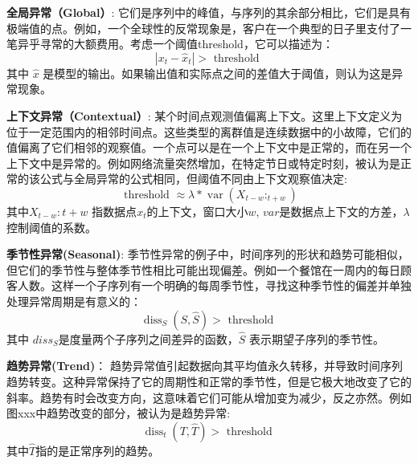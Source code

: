 \textbf{全局异常（Global）}: 它们是序列中的峰值，与序列的其余部分相比，它们是具有极端值的点。例如，一个全球性的反常现象是，客户在一个典型的日子里支付了一笔异乎寻常的大额费用。考虑一个阈值threshold，它可以描述为：
\begin{equation}
    \left|x_t-\hat{x}_t\right|>\text { threshold }
    \end{equation}
其中 $\hat{x}$ 是模型的输出。如果输出值和实际点之间的差值大于阈值，则认为这是异常现象。

\textbf{上下文异常（Contextual）}: 某个时间点观测值偏离上下文。这里上下文定义为位于一定范围内的相邻时间点。这些类型的离群值是连续数据中的小故障，它们的值偏离了它们相邻的观察值。一个点可以是在一个上下文中是正常的，而在另一个上下文中是异常的。例如网络流量突然增加，在特定节日或特定时刻，被认为是正常的该公式与全局异常的公式相同，但阈值不同由上下文观察值决定:
\begin{equation}
    \text { threshold } \approx \lambda * \operatorname{var}\left(X_{t-w}:_{t+w}\right)
    \end{equation}
其中$X_{t-w}: t+w$ 指数据点$x_t$的上下文，窗口大小$w$, $var$是数据点上下文的方差，$\lambda$控制阈值的系数。

\textbf{季节性异常(Seasonal)}: 季节性异常的例子中，时间序列的形状和趋势可能相似，但它们的季节性与整体季节性相比可能出现偏差。例如一个餐馆在一周内的每日顾客人数。这样一个子序列有一个明确的每周季节性，寻找这种季节性的偏差并单独处理异常周期是有意义的：
\begin{equation}
    \operatorname{diss}_S(S, \hat{S})>\text { threshold }
    \end{equation}
其中 ${diss}_S $是度量两个子序列之间差异的函数，$\hat{S}$ 表示期望子序列的季节性。

\textbf{趋势异常(Trend)}： 趋势异常值引起数据向其平均值永久转移，并导致时间序列趋势转变。这种异常保持了它的周期性和正常的季节性，但是它极大地改变了它的斜率。趋势有时会改变方向，这意味着它们可能从增加变为减少，反之亦然。例如图xxx中趋势改变的部分，被认为是趋势异常:
\begin{equation}
    \operatorname{diss}_t(T, \hat{T})>\text { threshold }
    \end{equation}
其中$\hat{T}$指的是正常序列的趋势。

